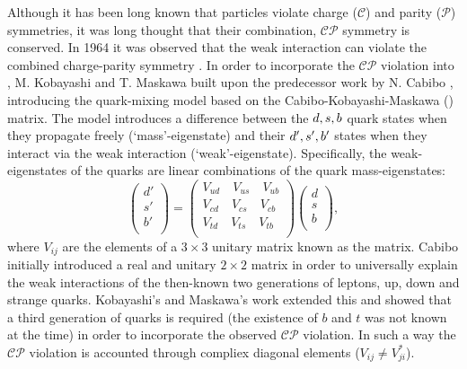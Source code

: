 Although it has been long known that particles violate charge ($\mathcal{C}$) and parity ($\mathcal{P}$) symmetries,
it was long thought that their combination, $\mathcal{CP}$ symmetry is conserved.
In 1964 it was observed that the weak interaction can violate the combined charge-parity symmetry \cite{Christenson:1964fg}.
In order to incorporate the $\mathcal{CP}$ violation into \SM, M. Kobayashi and T. Maskawa \cite{Kobayashi:1973fv} built upon the predecessor work by N. Cabibo \cite{Cabibbo:1963yz},
introducing the quark-mixing model based on the Cabibo-Kobayashi-Maskawa (\CKM) matrix. 
The model introduces a difference between the $d,s,b$ quark states when they propagate freely (`mass'-eigenstate) and their $d',s',b'$ states when they interact
via the weak interaction (`weak'-eigenstate).
Specifically, the weak-eigenstates of the quarks are linear combinations of the quark mass-eigenstates:
\begin{equation}
    \begin{pmatrix}
        d'\\
        s'\\
        b'\\
    \end{pmatrix}
    =
    \begin{pmatrix}
        V_{ud} \quad V_{us} \quad V_{ub}\\
        V_{cd} \quad V_{cs} \quad V_{cb}\\
        V_{td} \quad V_{ts} \quad V_{tb}\\
    \end{pmatrix}
    \begin{pmatrix}
        d\\
        s\\
        b\\
    \end{pmatrix},
\end{equation}
where $V_{ij}$ are the elements of a $3\times3$ unitary matrix known as the \CKM matrix.
Cabibo initially introduced a real and unitary $2\times2$ matrix in order to universally explain the weak interactions of
the then-known two generations of leptons, up, down and strange quarks.
Kobayashi's and Maskawa's work extended this and showed that a third generation of quarks is required 
(the existence of $b$ and $t$ was not known at the time) in order to incorporate the observed $\mathcal{CP}$ violation.
In such a way the $\mathcal{CP}$ violation is accounted through compliex diagonal elements ($V_{ij}\neq V_{ji}^*$).

